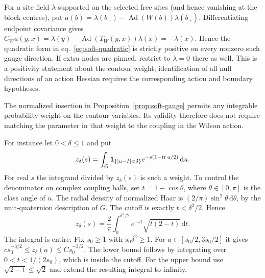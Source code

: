 \documentclass[11pt,letterpaper,reqno]{amsart}
\numberwithin{equation}{section}
\renewcommand{\eqref}[1]{\textup{eq.~\ref{#1}}}
\theoremstyle{definition}
\theoremstyle{remark}
\begin{document}
For a site field $\lambda$ supported on the selected free sites
(and hence vanishing at the block centres), put
$a(b)=\lambda(b_-)-\operatorname{Ad}(W(b))\lambda(b_+)$.
Differentiating endpoint covariance gives
$C_Wa(y,x)=\lambda(y)-\operatorname{Ad}(T_W(y,x))\lambda(x)
=-\lambda(x)$. Hence the quadratic form in
\eqref{eq:soft-quadratic} is strictly positive on every nonzero
such gauge direction. If extra nodes are pinned, restrict to
$\lambda=0$ there as well. This is a positivity statement about the
contour weight; identification of all null directions of an action
Hessian requires the corresponding action and boundary hypotheses.

The normalized insertion in Proposition~\ref{prop:soft-gauge} permits
any integrable probability weight on the contour variables. Its
validity therefore does not require matching the parameter in that
weight to the coupling in the Wilson action.

For instance let \(0<\delta\le1\) and put
\[
 z_\delta(s)=\int_G {\bf1}_{\{|u-I|<\delta\}}
              e^{-s(1-\operatorname{tr}u/2)}\,\mathrm du .
\]
For real \(s\) the integrand divided by \(z_\delta(s)\) is such a
weight. To control the denominator on complex coupling balls, set
\(t=1-\cos\theta\), where \(\theta\in[0,\pi]\) is the class angle
of \(u\). The radial density of normalized Haar is
\((2/\pi)\sin^2\theta\,\mathrm d\theta\), by the unit-quaternion
description of \(G\). The cutoff is exactly \(t<\delta^2/2\).
Hence
\begin{equation}\label{eq:soft-z}
 z_\delta(s)=\frac{2}{\pi}\int_0^{\delta^2/2}
                 e^{-st}\sqrt{t(2-t)}\,\mathrm dt .
\end{equation}
The integral is entire. Fix \(s_0\geq1\) with \(s_0\delta^2\geq1\).
For \(a\in[s_0/2,3s_0/2]\) it gives
\(c s_0^{-3/2}\leq z_\delta(a)\leq C s_0^{-3/2}\).
The lower bound follows by integrating over \(0<t<1/(2s_0)\),
which is inside the cutoff. For the upper bound use
\(\sqrt{2-t}\leq\sqrt2\) and extend the resulting integral to
infinity.
\end{document}
